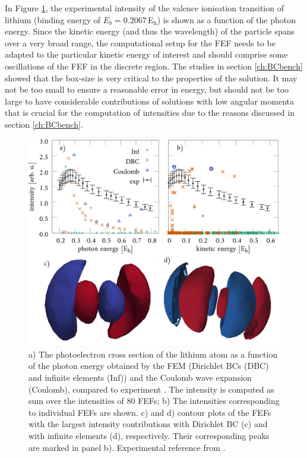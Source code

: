 In Figure \ref{fig:Li-CS}, the experimental intensity of the valence ionisation transition of lithium (binding energy of $E_b=0.2067\,$E$_\text{h}$) is shown as a function of the photon energy.
Since the kinetic energy (and thus the wavelength) of the particle spans over a very broad range, the computational setup for the FEF needs to be adapted to the particular kinetic energy of interest and should comprise some oscillations of the FEF in the discrete region.
The studies in section \ref{ch:BCbench} showed that the box-size is very critical to the properties of the solution.
It may not be too small to ensure a reasonable error in energy, but should not be too large to have considerable contributions of solutions with low angular momenta that is crucial for the computation of intensities due to the reasons discussed in section \ref{ch:BCbench}.
\begin{figure}
\includegraphics[width=\textwidth]{Figures/Lithium/CrossSect2}
\caption{a) The photoelectron cross section of the lithium atom as a function of the photon energy obtained by the FEM (Dirichlet BCs (DBC) and infinite elements (Inf)) and the Coulomb wave expansion (Coulomb), compared to experiment \cite{LiCS}.
The intensity is computed as sum over the intensities of $80$ FEFs;
b) The intensities corresponding to individual FEFs are shown.
c) and d) contour plots of the FEFs with the largest intensity contributions with Dirichlet BC (c) and with infinite elements (d), respectively.
Their corresponding peaks are marked in panel b). 
Experimental reference from \cite{LiCS}.}
\label{fig:Li-CS}
\end{figure}
